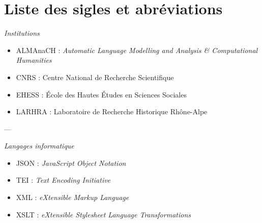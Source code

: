 \chapter*{Liste des sigles et abréviations}

\begin{center}
\textit{Institutions}
\end{center} 

\begin{itemize}
    \item ALMAnaCH : \emph{Automatic Language Modelling and Analysis \& Computational Humanities}
    \item CNRS : Centre National de Recherche Scientifique
    \item EHESS : École des Hautes Études en Sciences Sociales
    \item LARHRA : Laboratoire de Recherche Historique Rhône-Alpe
\end{itemize}

\bigbreak

\bigbreak

\begin{center}---

\bigbreak

\textit{Langages informatique}
\end{center} 

\bigbreak

\begin{itemize}
    \item JSON : \emph{JavaScript Object Notation}
    \item TEI : \emph{Text Encoding Initiative}
    \item XML : \emph{eXtensible Markup Language}
    \item XSLT : \emph{eXtensible Stylesheet Language Transformations}
\end{itemize}

\clearpage
\thispagestyle{empty}